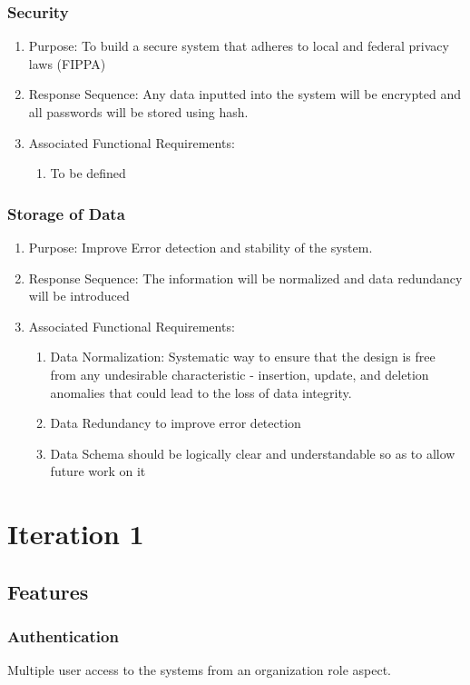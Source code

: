 \documentclass{journal}
\begin{document}
\subsubsection{Security}
\begin{enumerate}
\item Purpose: To build a secure system that adheres to local and federal privacy laws (FIPPA)
	\item Response Sequence: Any data inputted into the system will be encrypted and all passwords will be stored using hash.
	\item Associated Functional Requirements:
	\begin{enumerate}
	\item To be defined
	\end{enumerate}
	\end{enumerate}


	\subsubsection{Storage of Data}
	\begin{enumerate}
	\item Purpose: Improve Error detection and stability of the system.
	\item Response Sequence: The information will be normalized and data redundancy will be introduced
	\item Associated Functional Requirements:
	\begin{enumerate}
	\item Data Normalization: Systematic way to ensure that the design is free from any undesirable characteristic - insertion, update, and deletion anomalies that could lead to the loss of data integrity.
	\item Data Redundancy to improve error detection
	\item Data Schema should be logically clear and understandable so as to allow future work on it
	\end{enumerate}
	\end{enumerate}
	\newpage

	\section{Iteration 1}
	\subsection{Features}
	\subsubsection{Authentication}
	Multiple user access to the systems from an organization role aspect.
\end{document}
